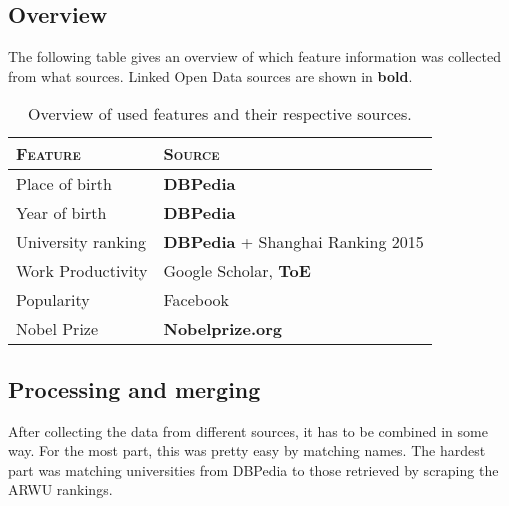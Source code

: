 \subsection{Overview}

The following table gives an overview of which feature information was collected from what sources. Linked Open Data sources are shown in \textbf{bold}.

\begin{table}[H]
\centering
\begin{tabular}{l|l}
	\textbf{\textsc{Feature}} & \textbf{\textsc{Source}} \\ \hline
	\rule{0pt}{4mm}Place of birth & \textbf{DBPedia} \\
	Year of birth & \textbf{DBPedia} \\
	University ranking & \textbf{DBPedia} + Shanghai Ranking 2015\\
	Work Productivity & Google Scholar, \textbf{ToE}\\
	Popularity & Facebook\\
	Nobel Prize& \textbf{Nobelprize.org}
\end{tabular}
\caption{Overview of used features and their respective sources.}
\end{table}

\subsection{Processing and merging}

After collecting the data from different sources, it has to be combined in some way. For the most part, this was pretty easy by matching names. The hardest part was matching universities from DBPedia to those retrieved by scraping the ARWU rankings.
